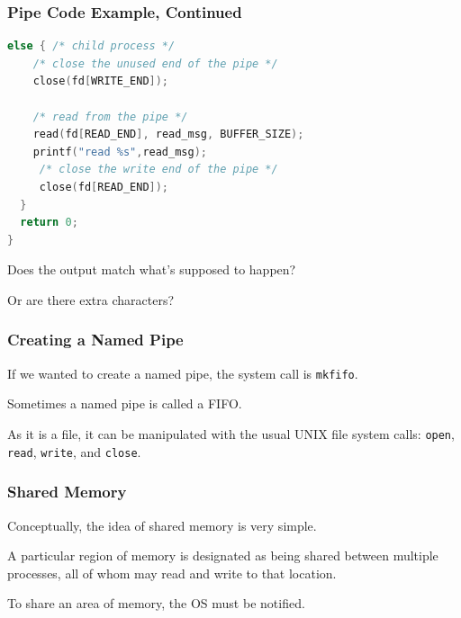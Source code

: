 \begin{frame}[fragile]
	\frametitle{Pipe Code Example, Continued}


	\begin{lstlisting}[language=C]
  else { /* child process */
    /* close the unused end of the pipe */ 
    close(fd[WRITE_END]);
    
    /* read from the pipe */
    read(fd[READ_END], read_msg, BUFFER_SIZE); 
    printf("read %s",read_msg);
     /* close the write end of the pipe */
     close(fd[READ_END]); 
  }
  return 0;
}
\end{lstlisting}

	Does the output match what's supposed to happen?

	Or are there extra characters?

\end{frame}

\begin{frame}
	\frametitle{Creating a Named Pipe}

	If we wanted to create a named pipe, the system call is \texttt{mkfifo}.

	Sometimes a named pipe is called a FIFO.

	As it is a file, it can be manipulated with the usual UNIX file system calls: \texttt{open}, \texttt{read}, \texttt{write}, and \texttt{close}.

\end{frame}


\begin{frame}
	\frametitle{Shared Memory}

	Conceptually, the idea of shared memory is very simple.

	A particular region of memory is designated as being shared between multiple processes, all of whom may read and write to that location.

	To share an area of memory, the OS must be notified.

\end{frame}


